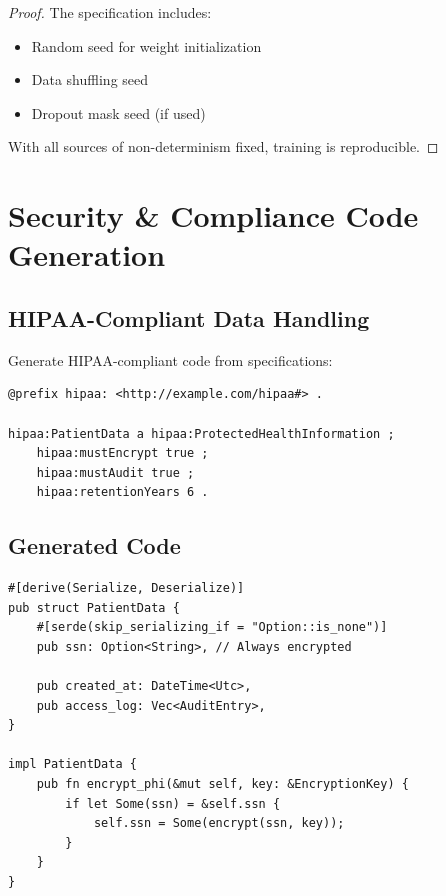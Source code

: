 \begin{theorem}[Reproducible Training]}
    If random seed is specified in RDF, training is reproducible.
\end{theorem}

\begin{proof}
    The specification includes:
    \begin{itemize}
        \item Random seed for weight initialization
        \item Data shuffling seed
        \item Dropout mask seed (if used)
    \end{itemize}
    With all sources of non-determinism fixed, training is reproducible.
\end{proof}

\section{Security \& Compliance Code Generation}

\subsection{HIPAA-Compliant Data Handling}

Generate HIPAA-compliant code from specifications:

\begin{verbatim}
@prefix hipaa: <http://example.com/hipaa#> .

hipaa:PatientData a hipaa:ProtectedHealthInformation ;
    hipaa:mustEncrypt true ;
    hipaa:mustAudit true ;
    hipaa:retentionYears 6 .
\end{verbatim}

\subsection{Generated Code}

\begin{verbatim}
#[derive(Serialize, Deserialize)]
pub struct PatientData {
    #[serde(skip_serializing_if = "Option::is_none")]
    pub ssn: Option<String>, // Always encrypted

    pub created_at: DateTime<Utc>,
    pub access_log: Vec<AuditEntry>,
}

impl PatientData {
    pub fn encrypt_phi(&mut self, key: &EncryptionKey) {
        if let Some(ssn) = &self.ssn {
            self.ssn = Some(encrypt(ssn, key));
        }
    }
}
\end{verbatim}

